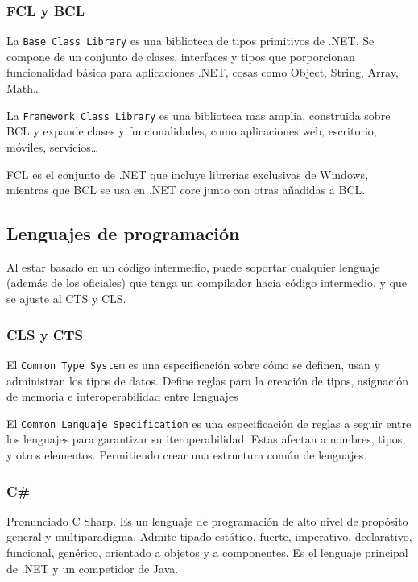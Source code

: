     \subsubsection{FCL y BCL}
        La \texttt{Base Class Library} es una biblioteca de tipos primitivos  de .NET. Se compone de un conjunto de clases, interfaces y tipos que porporcionan funcionalidad básica para aplicaciones .NET, cosas como Object, String, Array, Math\dots

        La \texttt{Framework Class Library} es una biblioteca mas amplia, construida sobre BCL y expande clases y funcionalidades, como aplicaciones web, escritorio, móviles, servicios\dots 
        
        FCL es el conjunto de .NET que incluye librerías exclusivas de Windows, mientras que BCL se usa en .NET core junto con otras añadidas a BCL.

\subsection{Lenguajes de programación}

    Al estar basado en un código intermedio, puede soportar cualquier lenguaje (además de los oficiales) que tenga un compilador hacia código intermedio, y que se ajuste al CTS y CLS.

    \subsubsection{CLS y CTS}
        El \texttt{Common Type System} es una especificación sobre cómo se definen, usan y administran los tipos de datos. Define reglas para la creación de tipos, asignación de memoria e interoperabilidad entre lenguajes

        El \texttt{Common Languaje Specification} es una especificación de reglas a seguir entre los lenguajes para garantizar su iteroperabilidad. Estas afectan a nombres, tipos, y otros elementos. Permitiendo crear una estructura común de lenguajes.

    \subsubsection{C\#}
        Pronunciado C Sharp. Es un lenguaje de programación de alto nivel de propósito general y multiparadigma. Admite tipado estático, fuerte, imperativo, declarativo, funcional, genérico, orientado a objetos y a componentes. Es el lenguaje principal de .NET y un competidor de Java.

